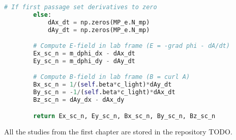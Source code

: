 \begin{lstlisting}[language=Python, basicstyle=\small,]
        # If first passage set derivatives to zero
        else:
            dAx_dt = np.zeros(MP_e.N_mp)
            dAy_dt = np.zeros(MP_e.N_mp)

        # Compute E-field in lab frame (E = -grad phi - dA/dt)
        Ex_sc_n = m_dphi_dx - dAx_dt
        Ey_sc_n = m_dphi_dy - dAy_dt

        # Compute B-field in lab frame (B = curl A)
        Bx_sc_n = 1/(self.beta*c_light)*dAy_dt
        By_sc_n = -1/(self.beta*c_light)*dAx_dt
        Bz_sc_n = dAy_dx - dAx_dy

        return Ex_sc_n, Ey_sc_n, Bx_sc_n, By_sc_n, Bz_sc_n

\end{lstlisting}

All the studies from the first chapter are stored in the repository TODO.

